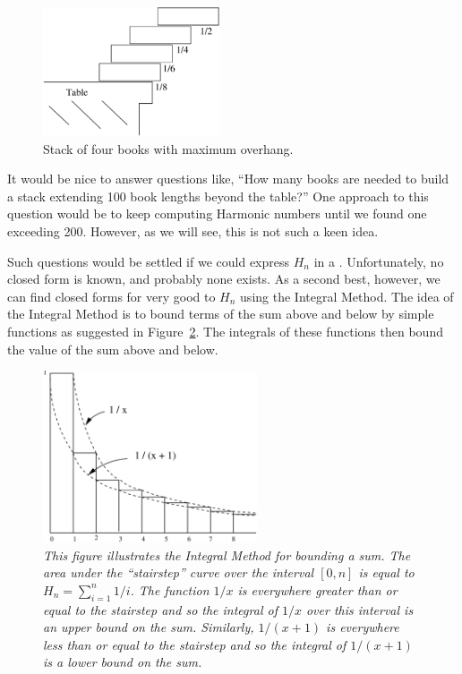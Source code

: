 \begin{figure}[htbp]
\centerline{\includegraphics[height=1.5in]{figures/optstack}}
\caption{Stack of four books with maximum overhang.}
\label{fig:optstack}
\end{figure}


It would be nice to answer questions like, ``How many books are needed
to build a stack extending 100 book lengths beyond the table?''  One
approach to this question would be to keep computing Harmonic numbers
until we found one exceeding 200.  However, as we will see, this is
not such a keen idea.

Such questions would be settled if we could express $H_n$ in a .  Unfortunately, no closed form is known, and probably none
exists.  As a second best, however, we can find closed forms for very good
 to $H_n$ using the Integral Method.  The idea of the
Integral Method is to bound terms of the sum above and below by simple
functions as suggested in Figure~\ref{fig:integral}.  The integrals of
these functions then bound the value of the sum above and below.

\begin{figure}[htbp]
\centerline{\includegraphics[height=2.0in]{figures/integral}}
\caption{\em This figure illustrates the Integral Method for bounding
a sum.  The area under the ``stairstep'' curve over the interval $[0,
n]$ is equal to $H_n = \sum_{i=1}^n 1/i$.  The function $1/x$ is
everywhere greater than or equal to the stairstep and so the integral
of $1/x$ over this interval is an upper bound on the sum.  Similarly,
$1/(x+1)$ is everywhere less than or equal to the stairstep and so the
integral of $1/(x+1)$ is a lower bound on the sum.}
\label{fig:integral}
\end{figure}

